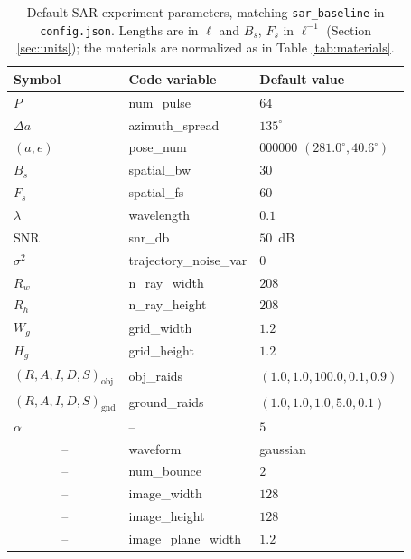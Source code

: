 \documentclass[sensors,article,submit,moreauthors]{Definitions/mdpi}
\begin{document}
\begin{table}[H]
\centering
\caption{Default SAR experiment parameters, matching \texttt{sar\_baseline} in
\texttt{config.json}. Lengths are in $\ell$ and $B_s$, $F_s$ in $\ell^{-1}$
(Section \ref{sec:units}); the materials are normalized as in Table
\ref{tab:materials}.}
\label{tab:params}
\begin{tabular}{lll}
\toprule
\textbf{Symbol} & \textbf{Code variable} & \textbf{Default value} \\
\midrule
$P$                       & num\_pulse             & $64$ \\
$\Delta a$                & azimuth\_spread        & $135^\circ$ \\
$(a,e)$                   & pose\_num              & 000000 $(281.0^\circ,
40.6^\circ)$ \\
$B_s$                     & spatial\_bw            & $30$ \\
$F_s$                     & spatial\_fs            & $60$ \\
$\lambda$                 & wavelength             & $0.1$ \\
SNR                       & snr\_db                & $50$~dB \\
$\sigma^2$                & trajectory\_noise\_var & $0$ \\
$R_w$                     & n\_ray\_width          & $208$ \\
$R_h$                     & n\_ray\_height         & $208$ \\
$W_g$                     & grid\_width            & $1.2$ \\
$H_g$                     & grid\_height           & $1.2$ \\
$(R,A,I,D,S)_{\text{obj}}$ & obj\_raids            & $(1.0, 1.0, 100.0, 0.1,
0.9)$ \\
$(R,A,I,D,S)_{\text{gnd}}$ & ground\_raids         & $(1.0, 1.0, 1.0, 5.0, 0.1)$
\\
$\alpha$                  & --                     & $5$ \\
\multicolumn{1}{c}{--} & waveform               & gaussian \\
\multicolumn{1}{c}{--} & num\_bounce            & $2$ \\
\multicolumn{1}{c}{--} & image\_width           & $128$ \\
\multicolumn{1}{c}{--} & image\_height          & $128$ \\
\multicolumn{1}{c}{--} & image\_plane\_width    & $1.2$ \\

\end{tabular}
\end{table}
\end{document}
